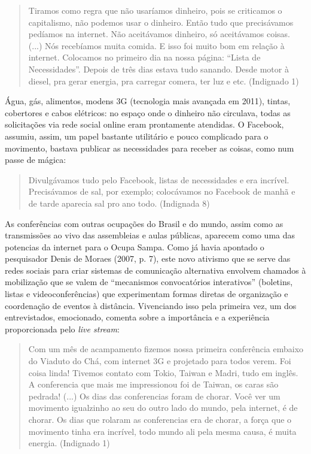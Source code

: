 \begin{quote}
Tiramos como regra que não usaríamos dinheiro, pois se criticamos o
capitalismo, não podemos usar o dinheiro. Então tudo que precisávamos
pedíamos na internet. Não aceitávamos dinheiro, só aceitávamos coisas.
(...) Nós recebíamos muita comida. E isso foi muito bom em relação à
internet. Colocamos no primeiro dia na nossa página: ``Lista de
Necessidades''. Depois de três dias estava tudo sanando. Desde motor à
diesel, pra gerar energia, pra carregar comera, ter luz e etc.
(Indignado 1)
\end{quote}

Água, gás, alimentos, modens 3G (tecnologia mais avançada em 2011),
tintas, cobertores e cabos elétricos: no espaço onde o dinheiro não
circulava, todas as solicitações via rede social online eram prontamente
atendidas. O Facebook, assumiu, assim, um papel bastante utilitário e
pouco complicado para o movimento, bastava publicar as necessidades para
receber as coisas, como num passe de mágica:

\begin{quote}
Divulgávamos tudo pelo Facebook, listas de necessidades e era incrível.
Precisávamos de sal, por exemplo; colocávamos no Facebook de manhã e de
tarde aparecia sal pro ano todo. (Indignada 8)
\end{quote}

As conferências com outras ocupações do Brasil e do mundo, assim como as
transmissões ao vivo das assembleias e aulas públicas, aparecem como uma
das potencias da internet para o Ocupa Sampa. Como já havia apontado o
pesquisador Denis de Moraes (2007, p. 7), este novo ativismo que se
serve das redes sociais para criar sistemas de comunicação alternativa
envolvem chamados à mobilização que se valem de ``mecanismos
convocatórios interativos'' (boletins, listas e videoconferências) que
experimentam formas diretas de organização e coordenação de eventos à
distância. Vivenciando isso pela primeira vez, um dos entrevistados,
emocionado, comenta sobre a importância e a experiência proporcionada
pelo \emph{live stream}:

\begin{quote}
Com um mês de acampamento fizemos nossa primeira conferência embaixo do
Viaduto do Chá, com internet 3G e projetado para todos verem. Foi coisa
linda! Tivemos contato com Tokio, Taiwan e Madri, tudo em inglês. A
conferencia que mais me impressionou foi de Taiwan, os caras são
pedrada! (...) Os dias das conferencias foram de chorar. Você ver um
movimento igualzinho ao seu do outro lado do mundo, pela internet, é de
chorar. Os dias que rolaram as conferencias era de chorar, a força que o
movimento tinha era incrível, todo mundo ali pela mesma causa, é muita
energia. (Indignado 1)
\end{quote}

